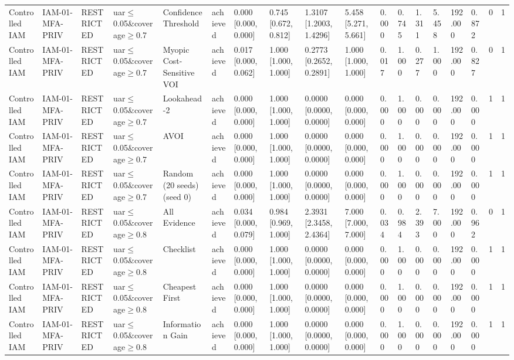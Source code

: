 \begin{table}[!ht]
{\begin{tabular}{llllllllllllllllll}
Controlled IAM & IAM-01-MFA-PRIV & RESTRICTED & uar$\le$0.05\&coverage$\ge$0.7 & Confidence Threshold & achieved & 0.000 [0.000, 0.000] & 0.745 [0.672, 0.812] & 1.3107 [1.2003, 1.4296] & 5.458 [5.271, 5.661] & 0.000 & 0.745 & 1.311 & 5.458 & 192.000 & 0.872 & 0 & 1 \\
Controlled IAM & IAM-01-MFA-PRIV & RESTRICTED & uar$\le$0.05\&coverage$\ge$0.7 & Myopic Cost-Sensitive VOI & achieved & 0.017 [0.000, 0.062] & 1.000 [1.000, 1.000] & 0.2773 [0.2652, 0.2891] & 1.000 [1.000, 1.000] & 0.017 & 1.000 & 0.277 & 1.000 & 192.000 & 0.827 & 0 & 1 \\
Controlled IAM & IAM-01-MFA-PRIV & RESTRICTED & uar$\le$0.05\&coverage$\ge$0.7 & Lookahead-2 & achieved & 0.000 [0.000, 0.000] & 1.000 [1.000, 1.000] & 0.0000 [0.0000, 0.0000] & 0.000 [0.000, 0.000] & 0.000 & 1.000 & 0.000 & 0.000 & 192.000 & 0.000 & 1 & 1 \\
Controlled IAM & IAM-01-MFA-PRIV & RESTRICTED & uar$\le$0.05\&coverage$\ge$0.7 & AVOI & achieved & 0.000 [0.000, 0.000] & 1.000 [1.000, 1.000] & 0.0000 [0.0000, 0.0000] & 0.000 [0.000, 0.000] & 0.000 & 1.000 & 0.000 & 0.000 & 192.000 & 0.000 & 1 & 1 \\
Controlled IAM & IAM-01-MFA-PRIV & RESTRICTED & uar$\le$0.05\&coverage$\ge$0.7 & Random (20 seeds) (seed 0) & achieved & 0.000 [0.000, 0.000] & 1.000 [1.000, 1.000] & 0.0000 [0.0000, 0.0000] & 0.000 [0.000, 0.000] & 0.000 & 1.000 & 0.000 & 0.000 & 192.000 & 0.000 & 1 & 1 \\
Controlled IAM & IAM-01-MFA-PRIV & RESTRICTED & uar$\le$0.05\&coverage$\ge$0.8 & All Evidence & achieved & 0.034 [0.000, 0.079] & 0.984 [0.969, 1.000] & 2.3931 [2.3458, 2.4364] & 7.000 [7.000, 7.000] & 0.034 & 0.984 & 2.393 & 7.000 & 192.000 & 0.962 & 0 & 1 \\
Controlled IAM & IAM-01-MFA-PRIV & RESTRICTED & uar$\le$0.05\&coverage$\ge$0.8 & Checklist & achieved & 0.000 [0.000, 0.000] & 1.000 [1.000, 1.000] & 0.0000 [0.0000, 0.0000] & 0.000 [0.000, 0.000] & 0.000 & 1.000 & 0.000 & 0.000 & 192.000 & 0.000 & 1 & 1 \\
Controlled IAM & IAM-01-MFA-PRIV & RESTRICTED & uar$\le$0.05\&coverage$\ge$0.8 & Cheapest First & achieved & 0.000 [0.000, 0.000] & 1.000 [1.000, 1.000] & 0.0000 [0.0000, 0.0000] & 0.000 [0.000, 0.000] & 0.000 & 1.000 & 0.000 & 0.000 & 192.000 & 0.000 & 1 & 1 \\
Controlled IAM & IAM-01-MFA-PRIV & RESTRICTED & uar$\le$0.05\&coverage$\ge$0.8 & Information Gain & achieved & 0.000 [0.000, 0.000] & 1.000 [1.000, 1.000] & 0.0000 [0.0000, 0.0000] & 0.000 [0.000, 0.000] & 0.000 & 1.000 & 0.000 & 0.000 & 192.000 & 0.000 & 1 & 1 \\

\end{tabular}}
\end{table}
